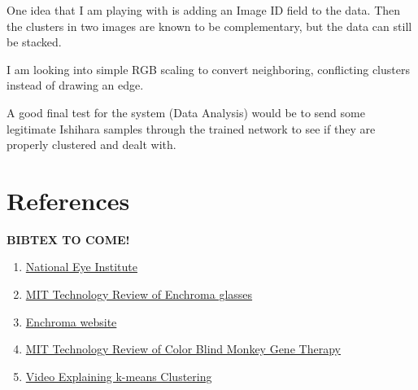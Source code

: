 \documentclass[12pt]{article}
\begin{document}
One idea that I am playing with is adding an Image ID field to the data. Then the clusters in two images are known to be complementary, but the data can still be stacked. 

I am looking into simple RGB scaling to convert neighboring, conflicting clusters instead of drawing an edge. 

A good final test for the system (Data Analysis) would be to send some legitimate Ishihara samples through the trained network to see if they are properly clustered and dealt with.

\section{References}
\singlespacing
\textbf{BIBTEX TO COME!}
\begin{enumerate}
	\item 
		\href{https://nei.nih.gov/health/color_blindness/facts_about}{National Eye Institute}

	\item
		\href{https://www.technologyreview.com/s/601782/how-enchromas-glasses-correct-color-blindness/}{MIT Technology Review of Enchroma glasses}
	
	\item
		\href{http://enchroma.com/contact-us/}{Enchroma website}
		
	\item
		\href{https://www.technologyreview.com/s/415339/color-blind-monkeys-get-full-color-vision/}{MIT Technology Review of Color Blind Monkey Gene Therapy}
		
	\item
		\href{https://www.youtube.com/watch?v=IuRb3y8qKX4}{Video Explaining k-means Clustering}
		


\end{enumerate}
\end{document}
